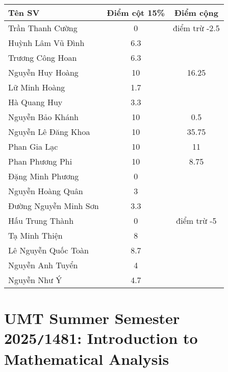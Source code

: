 \documentclass{article}
\begin{document}
\begin{table}[H]
    \centering
    \begin{tabular}{|l|c|c|}
        \hline
        {\bf Tên SV} & {\bf Điểm cột 15\%} & {\bf Điểm cộng} \\
        \hline
        Trần Thanh Cường & 0 & điểm trừ -2.5 \\
        \hline
        Huỳnh Lâm Vũ Đình & 6.3 &  \\
        \hline
        Trương Công Hoan & 6.3 &  \\
        \hline
        Nguyễn Huy Hoàng & 10 & 16.25 \\
        \hline
        Lữ Minh Hoàng & 1.7 &  \\
        \hline
        Hà Quang Huy & 3.3 &  \\
        \hline
        Nguyễn Bảo Khánh & 10 & 0.5 \\
        \hline
        Nguyễn Lê Đăng Khoa & 10 & 35.75 \\
        \hline
        Phan Gia Lạc & 10 & 11 \\
        \hline
        Phan Phương Phi & 10 & 8.75 \\
        \hline
        Đặng Minh Phương & 0 &  \\
        \hline
        Nguyễn Hoàng Quân & 3 &  \\
        \hline
        Đường Nguyễn Minh Sơn & 3.3 &  \\
        \hline
        Hấu Trung Thành & 0 & điểm trừ -5 \\
        \hline
        Tạ Minh Thiện & 8 &  \\
        \hline
        Lê Nguyễn Quốc Toàn & 8.7 &  \\
        \hline
        Nguyễn Anh Tuyển & 4 &  \\
        \hline
        Nguyễn Như Ý & 4.7 &  \\
        \hline
    \end{tabular}
\end{table}


\section{UMT Summer Semester 2025{\tt/}1481: Introduction to Mathematical Analysis}
\end{document}
